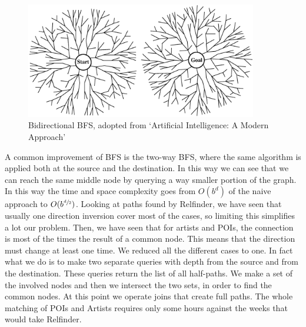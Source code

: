 \documentclass[paper=a4, fontsize=11pt]{scrartcl}
\begin{document}
\begin{figure}[!htb]
  \centering 
    \includegraphics[width=0.9\textwidth]{images/bfs.png}
    \caption{Bidirectional BFS, adopted from `Artificial Intelligence: A Modern Approach'~\cite{artificial_intelligence}}
\end{figure}

A common improvement of BFS is the two-way BFS, where the same algorithm is applied both at the source and the destination. In this way we can see that we can reach the same middle node by querying a way smaller portion of the graph. In this way the time and space complexity goes from $O(b^d)$ of the naive approach to $O(b^{\sfrac{d}{2}})$.
Looking at paths found by Relfinder, we have seen that usually one direction inversion cover most of the cases, so limiting this simplifies a lot our problem. Then, we have seen that for artists and POIs, the connection is most of the times the result of a common node. This means that the direction must change at least one time. We reduced all the different cases to one. In fact what we do is to make two separate queries with depth from the source and from the destination. These queries return the list of all half-paths. We make a set of the involved nodes and then we intersect the two sets, in order to find the common nodes. At this point we operate joins that create full paths. The whole matching of POIs and Artists  requires only some hours against the weeks that would take Relfinder.
\end{document}
